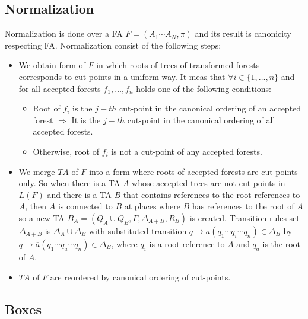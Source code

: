 \subsection{Normalization}
\label{subsec:norm}

Normalization is done over a FA $F = (A_1 \cdots A_N,\pi)$ and its result is canonicity respecting FA.
Normalization consist of the following steps:
\begin{itemize}
		\item We obtain form of $F$ in which roots of trees of transformed forests corresponds to
			cut-points in a uniform way.
			It meas that $\forall i \in \{1,\ldots,n\}$ and for all accepted forests $f_1,\ldots,f_n$ holds
			one of the following conditions:
			\begin{itemize}
				\item Root of $f_i$ is the $j-th$ cut-point in the canonical ordering of an accepted forest $\Rightarrow$
					It is the $j-th$ cut-point in the canonical ordering of all accepted forests.
				\item Otherwise, root of $f_i$ is not a cut-point of any accepted forests.
			\end{itemize}
		\item We merge $TA$ of $F$ into a form where roots of accepted forests are cut-points only.
			So when there is a TA $A$ whose accepted trees are not cut-points in $L(F)$ and there is
			a TA $B$ that contains references to the root references to $A$, then $A$ is connected
			to $B$ at places where $B$ has references to the root of $A$ so a new
			TA $B_A = (Q_A \cup Q_B, \Gamma, \Delta_{A+B}, R_B)$ is created.
			Transition rules set $\Delta_{A+B}$ is $\Delta_A \cup \Delta_B$ with substituted transition $q \rightarrow  \overline{a} (q_1 \cdots q_i \cdots q_n) \in \Delta_B$
			by $q \rightarrow  \overline{a} (q_1 \cdots q_a \cdots q_n) \in \Delta_B$, where $q_i$ is a root reference to $A$ and $q_a$ is the root of $A$. 
		\item $TA$ of $F$ are reordered by canonical ordering of cut-points.
\end{itemize}

\subsection{Boxes}
\label{subsec:boxes}

